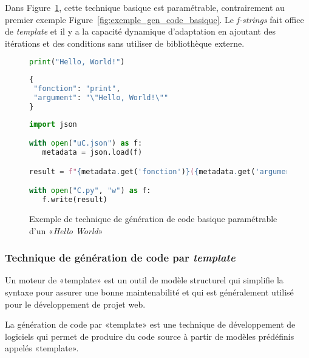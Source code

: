 Dans Figure~\ref{fig:exemple_gen_code_basique_2}, cette technique basique est paramétrable, contrairement au premier exemple Figure~\ref{fig:exemple_gen_code_basique}. Le \textit{f-strings} fait office de \textit{template} et il y a la capacité dynamique d’adaptation en ajoutant des itérations et des conditions sans utiliser de bibliothèque externe.

\begin{figure}
\begin{lstlisting}[language=Python, upquote=true, caption={C - fichier C.py de Figure~\ref{fig:exemple_gen_code_basique_2}}, label={lst:gen_code_basique_2_c}]
print("Hello, World!")
\end{lstlisting}

\begin{lstlisting}[language=Python, upquote=true, caption={µ$_C$ - fichier uC.json de Figure~\ref{fig:exemple_gen_code_basique_2}}, label={lst:gen_code_basique_2_uc}]
{
 "fonction": "print",
 "argument": "\"Hello, World!\""
}
\end{lstlisting}

\begin{lstlisting}[language=Python, upquote=true, caption={M(µ$_C$) de Figure~\ref{fig:exemple_gen_code_basique_2}}, label={lst:gen_code_basique_2_m}]
import json

with open("uC.json") as f:
   metadata = json.load(f)

result = f"{metadata.get('fonction')}({metadata.get('argument')})\n"

with open("C.py", "w") as f:
   f.write(result)
\end{lstlisting}
\caption{Exemple de technique de génération de code basique paramétrable d'un «\textit{Hello World}»}
\label{fig:exemple_gen_code_basique_2}
\end{figure}

\subsubsection{Technique de génération de code par \textit{template}}

Un moteur de «template» est un outil de modèle structurel qui simplifie la syntaxe pour assurer une bonne maintenabilité et qui est généralement utilisé pour le développement de projet web.

La génération de code par «template» est une technique de développement de logiciels qui permet de produire du code source à partir de modèles prédéfinis appelés «template».

